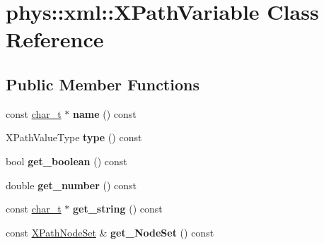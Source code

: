 \hypertarget{classphys_1_1xml_1_1XPathVariable}{
\section{phys::xml::XPathVariable Class Reference}
\label{df/dee/classphys_1_1xml_1_1XPathVariable}
}
\subsection*{Public Member Functions}
\begin{DoxyCompactItemize}
\item 
\hypertarget{classphys_1_1xml_1_1XPathVariable_a427617a6b86b1ec0b18449d79c11eeaf}{
const \hyperlink{namespacephys_1_1xml_afc87705cd1c2917d87b879715a2d8f6e}{char\_\-t} $\ast$ {\bfseries name} () const }
\label{df/dee/classphys_1_1xml_1_1XPathVariable_a427617a6b86b1ec0b18449d79c11eeaf}

\item 
\hypertarget{classphys_1_1xml_1_1XPathVariable_a7d288fe2bbf176e39cb80832bf414daa}{
XPathValueType {\bfseries type} () const }
\label{df/dee/classphys_1_1xml_1_1XPathVariable_a7d288fe2bbf176e39cb80832bf414daa}

\item 
\hypertarget{classphys_1_1xml_1_1XPathVariable_a8e879dfdd22d4e4cd00f79580de98068}{
bool {\bfseries get\_\-boolean} () const }
\label{df/dee/classphys_1_1xml_1_1XPathVariable_a8e879dfdd22d4e4cd00f79580de98068}

\item 
\hypertarget{classphys_1_1xml_1_1XPathVariable_a8d8ee4ea7868cbf76f2f926374ac5cab}{
double {\bfseries get\_\-number} () const }
\label{df/dee/classphys_1_1xml_1_1XPathVariable_a8d8ee4ea7868cbf76f2f926374ac5cab}

\item 
\hypertarget{classphys_1_1xml_1_1XPathVariable_a045574b064274e4b74e16b1e9e555991}{
const \hyperlink{namespacephys_1_1xml_afc87705cd1c2917d87b879715a2d8f6e}{char\_\-t} $\ast$ {\bfseries get\_\-string} () const }
\label{df/dee/classphys_1_1xml_1_1XPathVariable_a045574b064274e4b74e16b1e9e555991}

\item 
\hypertarget{classphys_1_1xml_1_1XPathVariable_a42aac5e1ef0d8231bc50dc6304738e62}{
const \hyperlink{classphys_1_1xml_1_1XPathNodeSet}{XPathNodeSet} \& {\bfseries get\_\-NodeSet} () const }
\label{df/dee/classphys_1_1xml_1_1XPathVariable_a42aac5e1ef0d8231bc50dc6304738e62}


\end{DoxyCompactItemize}
